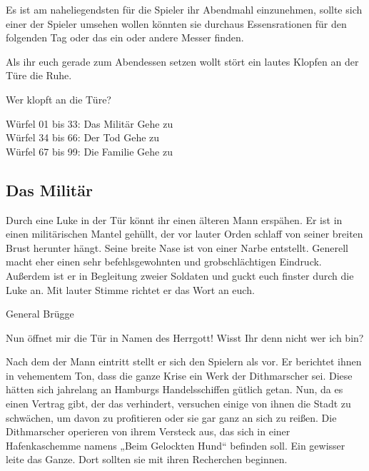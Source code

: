 \begin{info-box}

Es ist am naheliegendsten für die Spieler ihr Abendmahl einzunehmen, sollte sich
einer der Spieler umsehen wollen könnten sie durchaus Essensrationen für den
folgenden Tag oder das ein oder andere Messer finden.

\end{info-box}

Als ihr euch gerade zum Abendessen setzen wollt stört ein lautes Klopfen an der Türe
die Ruhe.

\begin{ref-box}{Wer klopft an die Türe?}

Würfel 01 bis 33: Das Militär \then Gehe zu  \\
Würfel 34 bis 66: Der Tod \then Gehe zu  \\
Würfel 67 bis 99: Die Familie \then Gehe zu 
\end{ref-box}

\subsection{Das Militär}
\label{ssec:militär}

Durch eine Luke in der Tür könnt ihr einen älteren Mann erspähen. Er ist in einen
militärischen Mantel gehüllt, der vor lauter Orden schlaff von seiner breiten
Brust herunter hängt. Seine breite Nase ist von einer Narbe entstellt. Generell
macht eher einen sehr befehlsgewohnten und grobschlächtigen Eindruck. Außerdem ist
er in Begleitung zweier Soldaten und guckt euch finster durch die Luke an. Mit
lauter Stimme richtet er das Wort an euch.

\begin{say-box}{General Brügge}

Nun öffnet mir die Tür in Namen des Herrgott! Wisst Ihr denn nicht wer ich bin?

\end{say-box}

Nach dem der Mann eintritt stellt er sich den Spielern als  vor.
Er berichtet ihnen in vehementem Ton, dass die ganze Krise ein Werk der Dithmarscher
sei. Diese hätten sich jahrelang an Hamburgs Handelsschiffen gütlich getan. Nun, da
es einen Vertrag gibt, der das verhindert, versuchen einige von ihnen die Stadt zu
schwächen, um davon zu profitieren oder sie gar ganz an sich zu reißen. Die
Dithmarscher operieren von ihrem Versteck aus, das sich in einer Hafenkaschemme
namens „Beim Gelockten Hund“ befinden soll. Ein gewisser 
leite das Ganze. Dort sollten sie mit ihren Recherchen beginnen.

